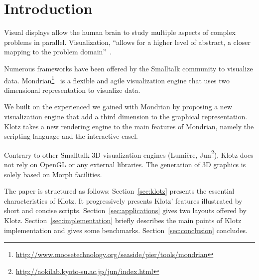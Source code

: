 \documentclass{sig-alternate}
\newcommand{\seclabel}[1]{\label{sec:#1}}
\newcommand{\figlabel}[1]{\label{fig:#1}}
\newcommand{\secref}[1]{Section~\ref{sec:#1}}
\begin{document}




\section{Introduction} \seclabel{introduction}

Visual displays allow the human brain to study multiple aspects of complex problems in parallel. Visualization, ``allows for a higher level of abstract, a closer mapping to the problem domain''~\cite{Petr95a}. 

Numerous frameworks have been offered by the Smalltalk community to visualize data. Mondrian\footnote{\url{http://www.moosetechnology.org/seaside/pier/tools/mondrian}}~\cite{Meye06a} is a flexible and agile visualization engine that uses two dimensional representation to visualize data.  

We built on the experienced we gained with Mondrian by proposing a new visualization engine that add a third dimension to the graphical representation. Klotz takes a new rendering engine to the main features of Mondrian, namely the scripting language and the interactive easel.

Contrary to other Smalltalk 3D visualization engines (Lumi\`ere\cite{Oliv09a}, Jun\footnote{\url{http://aokilab.kyoto-su.ac.jp/jun/index.html}}), Klotz does not rely on OpenGL or any external libraries. The generation of 3D graphics is solely based on Morph facilities. 

The paper is structured as follows:
\secref{klotz} presents the essential characteristics of Klotz. It progressively presents Klotz' features illustrated by short and concise scripts. 
\secref{applications} gives two layouts offered by Klotz.
\secref{implementation} briefly describes the main points of Klotz implementation and gives some benchmarks.
\secref{conclusion} concludes.
\end{document}

